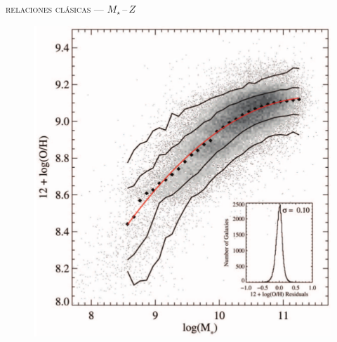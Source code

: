 \documentclass[xcolor=dvipsnames,4pt,hyperref={colorlinks,citecolor=black,linkcolor=black,urlcolor=black}]{beamer}
\begin{document}
\begin{frame}{\textsc{relaciones clásicas --- $M_\star\,$--$\,Z$}}

\begin{figure}
\includegraphics[scale=1]{img/tremonti2004-6}
\end{figure}
\end{frame}
\end{document}
